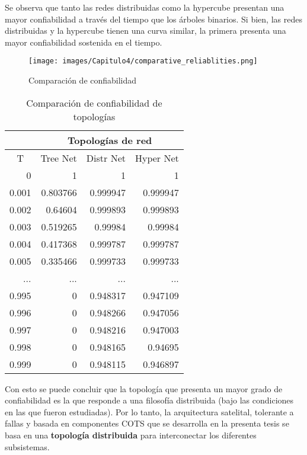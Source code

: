 Se observa que tanto las redes distribuidas como la hypercube presentan una mayor confiabilidad a través del tiempo que  los árboles binarios. Si bien, las redes distribuidas y la hypercube tienen una curva similar, la primera presenta una mayor confiabilidad sostenida en el tiempo.

\begin{figure}[H]
 \centering
 \texttt{[image: images/Capitulo4/comparative\_reliablities.png]}
  \caption{Comparación de confiabilidad}
\label{fig:comparative_reliablities}
\end{figure}

\begin{table}[H]
\centering
\caption{Comparación de confiabilidad de topologías}
\label{table_comprative_reliability}
\begin{tabular}{r|r|r|r|}
\cline{2-4}
\multicolumn{1}{l|}{} & \multicolumn{3}{c|}{Topologías de red} \\ \hline
\multicolumn{1}{|c|}{T} & \multicolumn{1}{c|}{Tree Net} & \multicolumn{1}{c|}{Distr Net} & \multicolumn{1}{c|}{Hyper Net} \\ \hline
\multicolumn{1}{|r|}{0} & 1 & 1 & 1 \\ \hline
\multicolumn{1}{|r|}{0.001} & 0.803766 & 0.999947 & 0.999947 \\ \hline
\multicolumn{1}{|r|}{0.002} & 0.64604 & 0.999893 & 0.999893 \\ \hline
\multicolumn{1}{|r|}{0.003} & 0.519265 & 0.99984 & 0.99984 \\ \hline
\multicolumn{1}{|r|}{0.004} & 0.417368 & 0.999787 & 0.999787 \\ \hline
\multicolumn{1}{|r|}{0.005} & 0.335466 & 0.999733 & 0.999733 \\ \hline
\multicolumn{1}{|r|}{...} & ... & ... & ... \\ \hline
\multicolumn{1}{|r|}{0.995} & 0 & 0.948317 & 0.947109 \\ \hline
\multicolumn{1}{|r|}{0.996} & 0 & 0.948266 & 0.947056 \\ \hline
\multicolumn{1}{|r|}{0.997} & 0 & 0.948216 & 0.947003 \\ \hline
\multicolumn{1}{|r|}{0.998} & 0 & 0.948165 & 0.94695 \\ \hline
\multicolumn{1}{|r|}{0.999} & 0 & 0.948115 & 0.946897 \\ \hline
\end{tabular}
\end{table}


Con esto se puede concluir que la topología que presenta un mayor grado de confiabilidad es la que responde a una filosofía distribuida (bajo las condiciones en las que fueron estudiadas). Por lo tanto, la arquitectura satelital, tolerante a fallas y basada en componentes COTS que se desarrolla en la presenta tesis se basa en una \textbf{topología distribuida} para interconectar los diferentes subsistemas.


